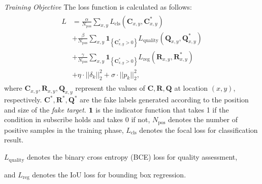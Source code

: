 \documentclass[journal]{IEEEtran}
\begin{document}
\textit{Training Objective} The loss function is calculated as follows:
\begin{equation}
\begin{array}{l}
\begin{aligned}
L&=\frac{\alpha}{N_{\mathrm{pos}}} \sum_{x, y} L_{\mathrm{cls}}\left(\textbf{C}_{x, y}, \textbf{C}_{x, y}^{*}\right) \\
&+\frac{\beta}{N_{\mathrm{pos}}} \sum_{x, y} \textbf{1}_{\left\{\textbf{C}_{x, y}^{*}>0\right\}} L_{\mathrm{quality}}\left(\textbf{Q}_{x, y}, \textbf{Q}_{x, y}^{*}\right) \\
&+\frac{\gamma}{N_{\mathrm{pos}}} \sum_{x, y} \textbf{1}_{\left\{\textbf{C}_{x, y}^{*}>0\right\}} L_{\mathrm{reg}}\left(\textbf{R}_{x, y}, \textbf{R}_{x, y}^{*}\right) \\
&+\eta \cdot ||\delta_k||_2^2 +  \sigma \cdot ||p_k||^2_2,
\end{aligned}
\end{array}
\label{eq:loss}
\end{equation}
where $\textbf{C}_{x, y}, \textbf{R}_{x, y}, \textbf{Q}_{x, y}$ represent the values of $\textbf{C}, \textbf{R}, \textbf{Q}$ at location $(x, y)$, respectively. $\textbf{C}^*, \textbf{R}^*, \textbf{Q}^*$ are the fake labels generated according to the position and size of the \textit{fake target}. $\textbf 1$ is the indicator function that takes 1 if the condition in subscribe holds and takes 0 if not, $N_{\mathrm{pos}}$ denotes the number of positive samples in the training phase, $L_{\mathrm{cls}}$ denotes the focal loss \cite{focal} for classification result.

$L_{\mathrm{quality}}$ denotes the binary cross entropy (BCE) loss for quality assessment,

and $L_{\mathrm{reg}}$ denotes the IoU loss \cite{iou-loss} for bounding box regression.

  
\end{document}
